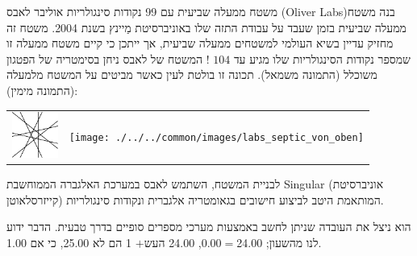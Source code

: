 \begin{surferPage}{%
משטח ממעלה שביעית עם 99 נקודות סינגולריות%
}
    אוליבר לאבס
    \textenglish{ (Oliver Labs)}בנה משטח ממעלה שביעית בזמן שעבד על
    עבודת התזה שלו באוניברסיטת מַיינץ בשנת 2004. משטח זה מחזיק עדיין בשיא העולמי למשטחים ממעלה שביעית,
    אך ייתכן כי קיים משטח ממעלה זו שמספר נקודות הסינגולריות שלו מגיע עד $104$
    !
    המשטח של לאבס ניחן בסימטריה של הפטגון משוכלל (התמונה משמאל).
    תכונה זו בולטת לעין כאשר מביטים על המשטח מלמעלה (התמונה מימין):

    \vspace*{-0.3em}
    \begin{center}
      \begin{tabular}{c@{\qquad}c}
        \includegraphics[height=1.5cm]{./../../common/images/labsseptic1.pdf}
        &
        \texttt{[image: ./../../common/images/labs\_septic\_von\_oben]}
      \end{tabular}
    \end{center}
    \vspace*{-0.3em}

    לבניית המשטח, השתמש לאבס במערכת האלגברה הממוחשבת
    {\sc Singular} (אוניברסיטת קייזרסלאוטן) המותאמת היטב
    לביצוע חישובים בגאומטריה אלגברית ונקודות סינגולריות.

    הוא ניצל את העובדה שניתן לחשב באמצעות מערכי מספרים סופיים
    בדרך טבעית. הדבר ידוע לנו מהשעון; 24.00$=$0.00, 24.00 $+ שעה $ 1 הם
    לא 25.00, כי אם 1.00.
\end{surferPage}
